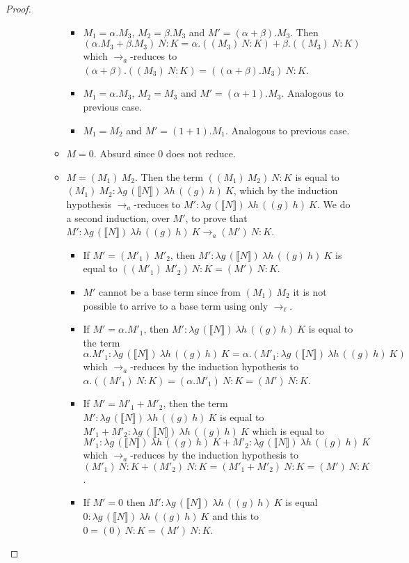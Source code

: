 \documentclass{LMCS}
\newcommand{\xto}[1]{\ensuremath{\rightarrow_{#1}}}
\newcommand{\tolinred}{\xto{\ell}}
\newcommand{\toalgred}{\xto{a}}
\newcommand{\wt}[1]{\llbracket{#1}\rrbracket}
\begin{document}
\begin{proof}
\begin{description}
\begin{itemize}
\begin{itemize}
\begin{itemize}
		\item $M_1=\alpha.M_3$, $M_2=\beta.M_3$ and $M'=(\alpha+\beta).M_3$. Then $(\alpha.M_3+\beta.M_3)~N:K=\alpha.((M_3)~N:K)+\beta.((M_3)~N:K)$ which \toalgred-reduces to $(\alpha+\beta).((M_3)~N:K)=((\alpha+\beta).M_3)~N:K$.
		\item $M_1=\alpha.M_3$, $M_2=M_3$ and $M'=(\alpha+1).M_3$. Analogous to previous case.
		\item $M_1=M_2$ and $M'=(1+1).M_1$. Analogous to previous case.
	      \end{itemize}
	    \item $M=0$. Absurd since $0$ does not reduce.
	    \item $M=(M_1)~M_2$. Then the term $((M_1)~M_2)~N:K$ is equal to $(M_1)~M_2:\lambda g\,(\wt N)~\lambda h\,((g)~h)~K$, which by the induction hypothesis $\toalgred$-reduces to $M':\lambda g\,(\wt N)~\lambda h\,((g)~h)~K$.
	      We do a second induction, over $M'$, to prove that $M':\lambda g\,(\wt{N})~\lambda h\,((g)~h)~K\toalgred (M')~N:K$.
	      \begin{itemize} 
		\item If $M'=(M'_1)~M'_2$, then $M':\lambda g\,(\wt{N})~\lambda h\,((g)~h)~K$ is equal to $((M'_1)~M'_2)~N:K=(M')~N:K$.
		\item $M'$ cannot be a base term since from $(M_1)~M_2$ it is not possible to arrive to a base term using only $\tolinred$.
		\item If $M' = \alpha.M'_1$, then $M':\lambda g\,(\wt{N})~\lambda h\,((g)~h)~K$ is equal to the term $\alpha.M'_1:\lambda g\,(\wt{N})~\lambda h\,((g)~h)~K=\alpha.(M'_1:\lambda g\,(\wt{N})~\lambda h\,((g)~h)~K)$ which $\toalgred$-reduces by the induction hypothesis to $\alpha.((M'_1)~N:K) = (\alpha.M'_1)~N:K = (M')~N : K$.
		\item If $M' = M'_1+M'_2$, then the term $M':\lambda g\,(\wt{N})~\lambda h\,((g)~h)~K$ is equal to $M'_1+M'_2 :\lambda g\,(\wt{N})~\lambda h\,((g)~h)~K$ which is equal to $M'_1 :\lambda g\,(\wt{N})~\lambda h\,((g)~h)~K+M'_2 :\lambda g\,(\wt{N})~\lambda h\,((g)~h)~K$ which $\toalgred$-reduces by the induction hypothesis to $(M'_1)~N:K+(M'_2)~N : K = (M'_1+M'_2)~N:K = (M')~N : K$.
		\item If $M'=0$ then $M':\lambda g\,(\wt{N})~\lambda h\,((g)~h)~K$ is equal $0 :\lambda g\,(\wt{N})~\lambda h\,((g)~h)~K$ and this to $0= (0)~N:K = (M')~N : K$.\qedhere
	      \end{itemize}
	  \end{itemize}
      \end{itemize}
  \end{description} 
\end{proof}
\end{document}
